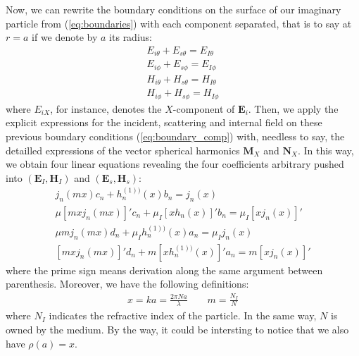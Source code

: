 \documentclass{article}
\numberwithin{equation}{section}
\begin{document}
Now, we can rewrite the boundary conditions on the surface of our imaginary particle from (\ref{eq:boundaries}) with each component separated, that is to say at $r=a$ if we denote by $a$ its radius:
\begin{equation}\label{eq:boundary_comp}
\begin{aligned}
E_{i\theta} + E_{s\theta} = E_{I\theta}\\
E_{i\phi} + E_{s\phi} = E_{I\phi}\\
H_{i\theta} + H_{s\theta} = H_{I\theta}\\
H_{i\phi} + H_{s\phi} = H_{I\phi}
\end{aligned}
\end{equation}
where $E_{iX}$, for instance, denotes the $X$-component of $\textbf{E}_{i}$. Then, we apply the explicit expressions for the incident, scattering and internal field on these previous boundary conditions (\ref{eq:boundary_comp}) with, needless to say, the detailled expressions of the vector spherical harmonics $\textbf{M}_{X}$ and $\textbf{N}_{X}$. In this way, we obtain four linear equations revealing the four coefficients arbitrary pushed into $(\textbf{E}_{I}, \textbf{H}_{I})$ and $(\textbf{E}_{s}, \textbf{H}_{s})$:
\begin{equation}
\begin{aligned}
j_{n}(mx)c_{n} + h^{(1))}_{n}(x)b_{n} = j_{n}(x) \\
\mu[mxj_{n}(mx)]'c_{n} + \mu_{I}[xh_{n}(x)]'b_{n} = \mu_{I}[xj_{n}(x)]' \\
\mu mj_{n}(mx)d_{n} + \mu_{I}h^{(1))}_{n}(x)a_{n} = \mu_{I}j_{n}(x) \\
[mxj_{n}(mx)]'d_{n}+m[xh^{(1))}_{n}(x)]'a_{n} = m[xj_{n}(x)]'
\end{aligned}
\end{equation}
where the prime sign means derivation along the same argument between parenthesis. Moreover, we have the following definitions:
\begin{equation}
\begin{aligned}
x = ka = \frac{2\pi Na}{\lambda} \qquad m = \frac{N_{I}}{N}
\end{aligned}
\end{equation}
where $N_{I}$ indicates the refractive index of the particle. In the same way, $N$ is owned by the medium. By the way, it could be intersting to notice that we also have $\rho(a)=x$. 
\end{document}
